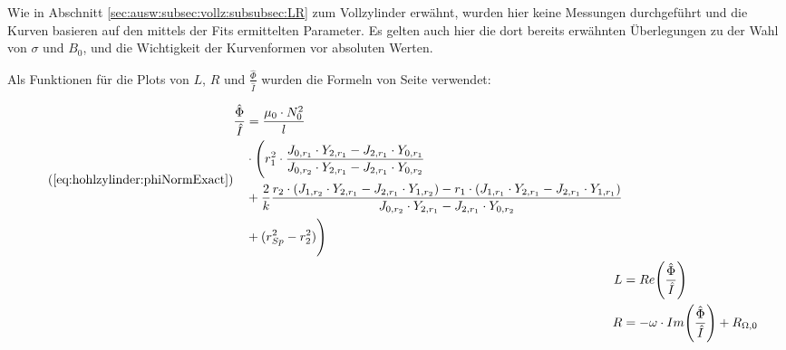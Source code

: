 {\begin{minipage}[t]{0.33\textwidth}
        Wie   in    Abschnitt   \ref{sec:ausw:subsec:vollz:subsubsec:LR}   zum
        Vollzylinder erw\"ahnt, wurden hier keine Messungen durchgef\"uhrt und
        die Kurven basieren auf den mittels der Fits ermittelten Parameter. Es
        gelten auch  hier die dort  bereits erw\"ahnten \"Uberlegungen  zu der
        Wahl von $\sigma$ und $B_0$,  und die Wichtigkeit der Kurvenformen vor
        absoluten Werten.

        Als    Funktionen    f\"ur    die    Plots   von    $L$,    $R$    und
        $\frac{\hat{\Phi}}{\hat{I}}$    wurden   die    Formeln   von    Seite
        \pageref{eq:hohlzylinder:phiNormExact} verwendet:

        \begin{align}
            \tag{\ref{eq:hohlzylinder:phiNormExact}}
            \begin{split}
            \frac{\hat{\Phi}}{\hat{I}} & = \frac{\mu_0 \cdot N_0^2}{l} \\
                                       & \cdot \Biggl( r_1^2 \cdot \frac{J_{0,r_1} \cdot Y_{2,r_1} - J_{2,r_1} \cdot Y_{0,r_1}}{J_{0,r_2} \cdot Y_{2,r_1} - J_{2,r_1} \cdot Y_{0,r_2}} \\
                                       & + \frac{2}{k} \frac{r_2 \cdot (J_{1,r_2} \cdot Y_{2,r_1} - J_{2,r_1} \cdot Y_{1,r_2}) - r_1 \cdot (J_{1,r_1} \cdot Y_{2,r_1} - J_{2,r_1} \cdot Y_{1,r_1})}{J_{0,r_2} \cdot Y_{2,r_1} - J_{2,r_1} \cdot Y_{0,r_2}} \\
                                       & + (r_{Sp}^2 - r_2^2) \Biggr)
            \end{split} \\
            L & = Re \Biggl(\frac{\hat{\Phi}}{\hat{I}} \Biggr) \\
            R & = - \omega \cdot Im \Biggl(\frac{\hat{\Phi}}{\hat{I}} \Biggr) + R_{\Omega,0}
        \end{align}


\end{minipage}}
